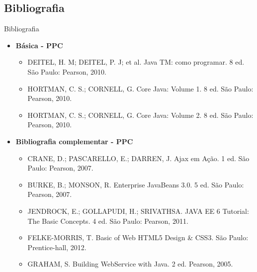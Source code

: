 \documentclass{beamer}
\begin{document}
\subsection{Bibliografia}

\begin{frame}{Bibliografia}
    \begin{itemize}
        \item \textbf{Básica - PPC}
        \begin{itemize}
            \justifying
            \scriptsize
            \item DEITEL, H. M; DEITEL, P. J; et al. Java TM: como programar. 8 ed. São Paulo: Pearson, 2010.
            \item HORTMAN, C. S.; CORNELL, G. Core Java: Volume 1. 8 ed. São Paulo: Pearson, 2010.
            \item HORTMAN, C. S.; CORNELL, G. Core Java: Volume 2. 8 ed. São Paulo: Pearson, 2010.
        \end{itemize}
        \normalsize
        \item \textbf{Bibliografia complementar - PPC}
        \begin{itemize}
            \justifying
            \scriptsize
            \item CRANE, D.; PASCARELLO, E.; DARREN, J. Ajax em Ação. 1 ed. São Paulo: Pearson, 2007.
            \item BURKE, B.; MONSON, R. Enterprise JavaBeans 3.0. 5 ed. São Paulo: Pearson, 2007.
            \item JENDROCK, E.; GOLLAPUDI, H.; SRIVATHSA. JAVA EE 6 Tutorial: The Basic Concepts. 4 ed. São Paulo: Pearson, 2011.
            \item FELKE-MORRIS, T. Basic of Web HTML5 Design \& CSS3. São Paulo: Prentice-hall, 2012.
            \item GRAHAM, S. Building WebService with Java. 2 ed. Pearson, 2005.
        \end{itemize}
    \end{itemize}
\end{frame}
\end{document}
